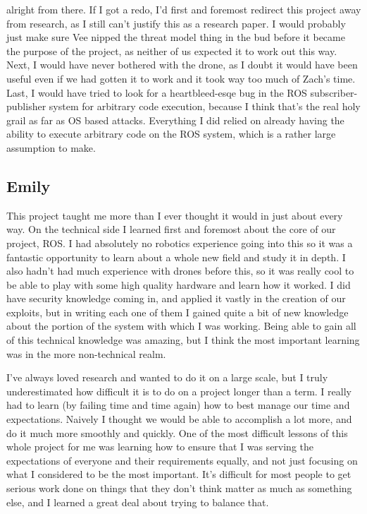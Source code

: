 \documentclass[IEEEtran,letterpaper,10pt,notitlepage,draftclsnofoot,onecolumn]{article}
\begin{document}
alright from there. If I got a redo, I’d first and foremost redirect this
project away from research, as I still can’t justify this as a research paper.
I would probably just make sure Vee nipped the threat model thing in the bud
before it became the purpose of the project, as neither of us expected it to
work out this way. Next, I would have never bothered with the drone, as I doubt
it would have been useful even if we had gotten it to work and it took way too
much of Zach’s time. Last, I would have tried to look for a heartbleed-esqe bug
in the ROS subscriber-publisher system for arbitrary code execution, because I
think that’s the real holy grail as far as OS based attacks. Everything I did
relied on already having the ability to execute arbitrary code on the ROS
system, which is a rather large assumption to make.

\subsection{Emily}
This project taught me more than I ever thought it would in just about every way.
On the technical side I learned first and foremost about the core of our project, ROS.
I had absolutely no robotics experience going into this so it was a fantastic opportunity to learn about a whole new field and study it in depth.
I also hadn't had much experience with drones before this, so it was really cool to be able to play with some high quality hardware and learn how it worked.
I did have security knowledge coming in, and applied it vastly in the creation of our exploits, but in writing each one of them I gained quite a bit of new knowledge about the portion of the system with which I was working.
Being able to gain all of this technical knowledge was amazing, but I think the most important learning was in the more non-technical realm.

I've always loved research and wanted to do it on a large scale, but I truly underestimated how difficult it is to do on a project longer than a term.
I really had to learn (by failing time and time again) how to best manage our time and expectations.
Naively I thought we would be able to accomplish a lot more, and do it much more smoothly and quickly.
One of the most difficult lessons of this whole project for me was learning how to ensure that I was serving the expectations of everyone and their requirements equally, and not just focusing on what I considered to be the most important.
It's difficult for most people to get serious work done on things that they don't think matter as much as something else, and I learned a great deal about trying to balance that.
\end{document}
